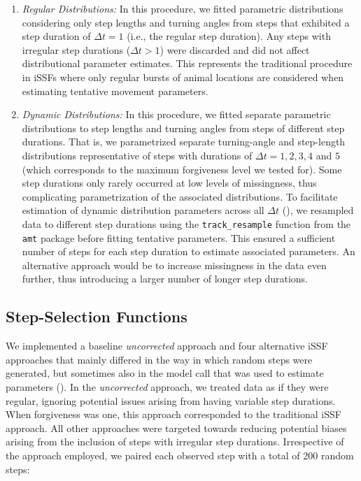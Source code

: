 \documentclass[../FinalThesis.tex]{subfiles}
\begin{document}
\begin{enumerate}

  \item \textit{Regular Distributions:} In this procedure, we fitted parametric
  distributions considering only step lengths and turning angles from steps that
  exhibited a step duration of $\Delta t = 1$ (i.e., the regular step duration).
  Any steps with irregular step durations ($\Delta t > 1$) were discarded and
  did not affect distributional parameter estimates. This represents the
  traditional procedure in iSSFs where only regular bursts of animal locations
  are considered when estimating tentative movement parameters.

  \item \textit{Dynamic Distributions:} In this procedure, we fitted separate
  parametric distributions to step lengths and turning angles from steps of
  different step durations. That is, we parametrized separate turning-angle and
  step-length distributions representative of steps with durations of $\Delta t
  = 1, 2, 3, 4$ and $5$ (which corresponds to the maximum forgiveness level we
  tested for). Some step durations only rarely occurred at low levels of
  missingness, thus complicating parametrization of the associated
  distributions. To facilitate estimation of dynamic distribution parameters
  across all $\Delta t$ (), we resampled data to
  different step durations using the \texttt{track\_resample} function from the
  \texttt{amt} package \citep{Signer.2019} before fitting tentative parameters.
  This ensured a sufficient number of steps for each step duration to estimate
  associated parameters. An alternative approach would be to increase
  missingness in the data even further, thus introducing a larger number of
  longer step durations.

\end{enumerate}

\subsection{Step-Selection Functions}

We implemented a baseline \textit{uncorrected} approach and four alternative
iSSF approaches that mainly differed in the way in which random steps were
generated, but sometimes also in the model call that was used to estimate
parameters (). In the \textit{uncorrected} approach, we treated
data as if they were regular, ignoring potential issues arising from having
variable step durations. When forgiveness was one, this approach corresponded
to the traditional iSSF approach. All other approaches were targeted towards
reducing potential biases arising from the inclusion of steps with irregular
step durations. Irrespective of the approach employed, we paired each observed
step with a total of 200 random steps:
\end{document}
